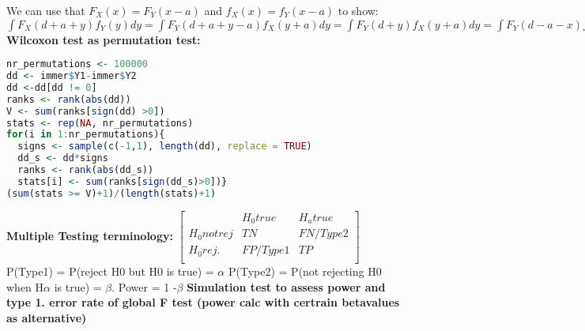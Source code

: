We can use that $F_X(x)=F_Y(x-a)$ and $f_X(x)=f_Y(x-a)$ to show: $\int F_X(d+a+y)f_Y(y)dy = \int F_Y(d+a+y-a)f_X(y+a)dy = \int F_Y(d+y)f_X(y+a)dy = \int F_Y(d-a-x)f_X(x)dx$ \\
\textbf{Wilcoxon test as permutation test:} 
\begin{lstlisting}[language=R]
nr_permutations <- 100000
dd <- immer$Y1-immer$Y2
dd <-dd[dd != 0]
ranks <- rank(abs(dd))
V <- sum(ranks[sign(dd) >0])
stats <- rep(NA, nr_permutations)
for(i in 1:nr_permutations){
  signs <- sample(c(-1,1), length(dd), replace = TRUE)
  dd_s <- dd*signs
  ranks <- rank(abs(dd_s))
  stats[i] <- sum(ranks[sign(dd_s)>0])}
(sum(stats >= V)+1)/(length(stats)+1)

\end{lstlisting}
\textbf{Multiple Testing terminology: }
$\begin{bmatrix}
& H_0 true & H_a true \\
H_0 not rej & TN & FN/Type2\\
H_0rej. & FP/Type1 & TP \\
\end{bmatrix}$\\
P(Type1) = P(reject H0 but H0 is true) = $\alpha$
P(Type2) = P(not rejecting H0 when H$\alpha$ is true) = $\beta$. Power = 1 -$\beta$
\textbf{Simulation test to assess power and type 1. error rate of global F test (power calc with certrain betavalues as alternative)}


